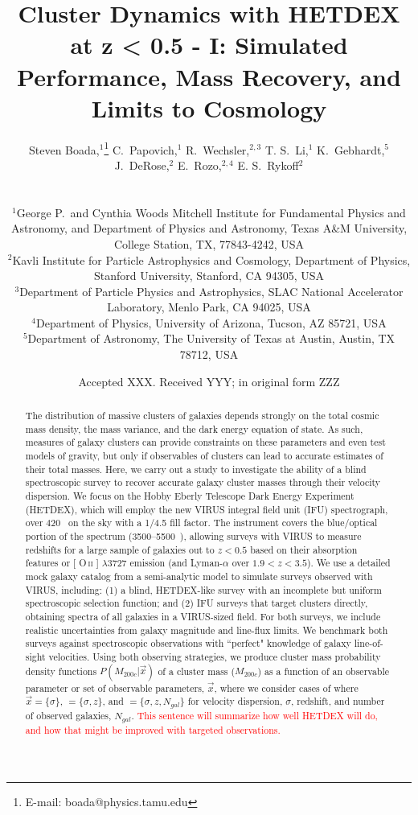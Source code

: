 \documentclass[fleqn,usenatbib]{mnras}
\title[Galaxy Clusters with HETDEX]{Cluster Dynamics with HETDEX at z < 0.5 - I: Simulated Performance, Mass Recovery, and Limits to Cosmology}
\author[S. Boada et al.]
{\parbox{\textwidth}{Steven Boada,$^{1}$\thanks{E-mail: boada@physics.tamu.edu}
C.~Papovich,$^{1}$
R.~Wechsler,$^{2,3}$
T. S.~Li,$^{1}$
K.~Gebhardt,$^{5}$
J.~DeRose,$^{2}$
E.~Rozo,$^{2,4}$
E. S.~Rykoff$^{2}$}\vspace{0.4cm}\
\\
\parbox{\textwidth}{$^{1}$George P.\ and Cynthia Woods Mitchell Institute for Fundamental Physics and Astronomy, and Department of Physics and Astronomy, Texas A\&M University, College Station, TX, 77843-4242, USA\\
$^{2}$Kavli Institute for Particle Astrophysics and Cosmology, Department of Physics, Stanford University, Stanford, CA 94305, USA\\
$^{3}$Department of Particle Physics and Astrophysics, SLAC National Accelerator Laboratory, Menlo Park, CA 94025, USA\\
$^{4}$Department of Physics, University of Arizona, Tucson, AZ 85721, USA\\
$^{5}$Department of Astronomy, The University of Texas at Austin, Austin, TX 78712, USA}}
\date{Accepted XXX. Received YYY; in original form ZZZ}
\makeatletter
\newcommand{\editorial}[1]{\textcolor{red}{#1}}
\DeclareRobustCommand{\ion}[2]{%
\relax\ifmmode
\ifx\testbx\f@series
{\mathbf{#1\,\mathsc{#2}}}\else
{\mathrm{#1\,\mathsc{#2}}}\fi
\else\textup{#1\,{\mdseries\textsc{#2}}}%
\fi}
\makeatother
\begin{document}
\label{firstpage}
\pagerange{\pageref{firstpage}--\pageref{lastpage}}
\maketitle

\begin{abstract}
\noindent
The distribution of massive clusters of galaxies depends strongly on the total cosmic mass density, the mass variance, and the dark energy equation of state. As such, measures of galaxy clusters can provide constraints on these parameters and even test models of gravity, but only if observables of clusters can lead to accurate estimates of their total masses. Here, we carry out a study to investigate the ability of a blind spectroscopic survey to recover accurate galaxy cluster masses through their velocity dispersion. We focus on the Hobby Eberly Telescope Dark Energy Experiment (HETDEX), which will employ the new VIRUS integral field unit (IFU) spectrograph, over 420 \degsq\ on the sky with a 1/4.5 fill factor. The instrument covers the blue/optical portion of the spectrum (3500--5500~\AAA), allowing surveys with VIRUS to measure redshifts for a large sample of galaxies out to $z < 0.5$ based on their absorption features or [\ion{O}{ii}] $\lambda$3727 emission (and Lyman-$\alpha$ over $1.9 < z < 3.5$). We use a detailed mock galaxy catalog from a semi-analytic model to simulate surveys observed with VIRUS, including: (1) a blind, HETDEX-like survey with an incomplete but uniform spectroscopic selection function; and (2) IFU surveys that target clusters directly, obtaining spectra of all galaxies in a VIRUS-sized field. For both surveys, we include realistic uncertainties from galaxy magnitude and line-flux limits. We benchmark both surveys against spectroscopic observations with ``perfect" knowledge of galaxy line-of-sight velocities. Using both observing strategies, we produce cluster mass probability density functions $P(M_{200c}|\vec{x})$ of a cluster mass ($M_{200c}$) as a function of an observable parameter or set of observable parameters, $\vec{x}$, where we consider cases of where $\vec{x} = \{\sigma\}$, $=\{\sigma, z\}$, and $=\{\sigma,z, N_{gal}\}$ for velocity dispersion, $\sigma$, redshift, and number of observed galaxies, $N_{gal}$. \editorial{This sentence will summarize how well HETDEX will do, and how that might be improved with targeted observations.}
\end{abstract}
\end{document}
